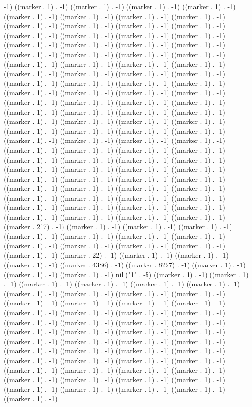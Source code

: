 -1) ((marker . 1) . -1) ((marker . 1) . -1) ((marker . 1) . -1) ((marker . 1) . -1) ((marker . 1) . -1) ((marker . 1) . -1) ((marker . 1) . -1) ((marker . 1) . -1) ((marker . 1) . -1) ((marker . 1) . -1) ((marker . 1) . -1) ((marker . 1) . -1) ((marker . 1) . -1) ((marker . 1) . -1) ((marker . 1) . -1) ((marker . 1) . -1) ((marker . 1) . -1) ((marker . 1) . -1) ((marker . 1) . -1) ((marker . 1) . -1) ((marker . 1) . -1) ((marker . 1) . -1) ((marker . 1) . -1) ((marker . 1) . -1) ((marker . 1) . -1) ((marker . 1) . -1) ((marker . 1) . -1) ((marker . 1) . -1) ((marker . 1) . -1) ((marker . 1) . -1) ((marker . 1) . -1) ((marker . 1) . -1) ((marker . 1) . -1) ((marker . 1) . -1) ((marker . 1) . -1) ((marker . 1) . -1) ((marker . 1) . -1) ((marker . 1) . -1) ((marker . 1) . -1) ((marker . 1) . -1) ((marker . 1) . -1) ((marker . 1) . -1) ((marker . 1) . -1) ((marker . 1) . -1) ((marker . 1) . -1) ((marker . 1) . -1) ((marker . 1) . -1) ((marker . 1) . -1) ((marker . 1) . -1) ((marker . 1) . -1) ((marker . 1) . -1) ((marker . 1) . -1) ((marker . 1) . -1) ((marker . 1) . -1) ((marker . 1) . -1) ((marker . 1) . -1) ((marker . 1) . -1) ((marker . 1) . -1) ((marker . 1) . -1) ((marker . 1) . -1) ((marker . 1) . -1) ((marker . 1) . -1) ((marker . 1) . -1) ((marker . 1) . -1) ((marker . 1) . -1) ((marker . 1) . -1) ((marker . 1) . -1) ((marker . 1) . -1) ((marker . 1) . -1) ((marker . 1) . -1) ((marker . 1) . -1) ((marker . 1) . -1) ((marker . 1) . -1) ((marker . 1) . -1) ((marker . 1) . -1) ((marker . 1) . -1) ((marker . 1) . -1) ((marker . 1) . -1) ((marker . 1) . -1) ((marker . 1) . -1) ((marker . 1) . -1) ((marker . 1) . -1) ((marker . 1) . -1) ((marker . 1) . -1) ((marker . 1) . -1) ((marker . 1) . -1) ((marker . 1) . -1) ((marker . 1) . -1) ((marker . 1) . -1) ((marker . 1) . -1) ((marker . 1) . -1) ((marker . 1) . -1) ((marker . 217) . -1) ((marker . 1) . -1) ((marker . 1) . -1) ((marker . 1) . -1) ((marker . 1) . -1) ((marker . 1) . -1) ((marker . 1) . -1) ((marker . 1) . -1) ((marker . 1) . -1) ((marker . 1) . -1) ((marker . 1) . -1) ((marker . 1) . -1) ((marker . 1) . -1) ((marker . 22) . -1) ((marker . 1) . -1) ((marker . 1) . -1) ((marker . 1) . -1) ((marker . 4386) . -1) ((marker . 8227) . -1) ((marker . 1) . -1) ((marker . 1) . -1) ((marker . 1) . -1) nil ("1" . -5) ((marker . 1) . -1) ((marker . 1) . -1) ((marker . 1) . -1) ((marker . 1) . -1) ((marker . 1) . -1) ((marker . 1) . -1) ((marker . 1) . -1) ((marker . 1) . -1) ((marker . 1) . -1) ((marker . 1) . -1) ((marker . 1) . -1) ((marker . 1) . -1) ((marker . 1) . -1) ((marker . 1) . -1) ((marker . 1) . -1) ((marker . 1) . -1) ((marker . 1) . -1) ((marker . 1) . -1) ((marker . 1) . -1) ((marker . 1) . -1) ((marker . 1) . -1) ((marker . 1) . -1) ((marker . 1) . -1) ((marker . 1) . -1) ((marker . 1) . -1) ((marker . 1) . -1) ((marker . 1) . -1) ((marker . 1) . -1) ((marker . 1) . -1) ((marker . 1) . -1) ((marker . 1) . -1) ((marker . 1) . -1) ((marker . 1) . -1) ((marker . 1) . -1) ((marker . 1) . -1) ((marker . 1) . -1) ((marker . 1) . -1) ((marker . 1) . -1) ((marker . 1) . -1) ((marker . 1) . -1) ((marker . 1) . -1) ((marker . 1) . -1) ((marker . 1) . -1) ((marker . 1) . -1) ((marker . 1) . -1) ((marker . 1) . -1) ((marker . 1) . -1) ((marker . 1) . -1) ((marker . 1) . -1) ((marker . 1) . -1) ((marker . 1) . -1) 